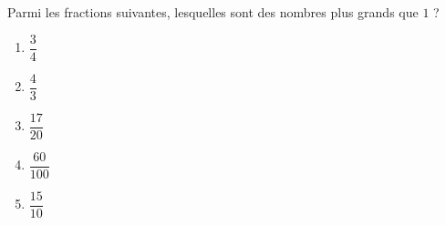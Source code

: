 
\begin{exercice}\label{exosmath-0908}

    Parmi les fractions suivantes, lesquelles sont des nombres plus grands que \( 1\) ?
    \begin{multicols}{5}
        \begin{enumerate}
            \item
                \( \dfrac{ 3 }{ 4 }\)
            \item
                \( \dfrac{ 4 }{ 3 }\)
            \item
                \( \dfrac{ 17 }{ 20 }\)
            \item
                \( \dfrac{ 60 }{ 100 }\)
            \item
                \( \dfrac{ 15 }{ 10 }\)
        \end{enumerate}
    \end{multicols}

\end{exercice}

